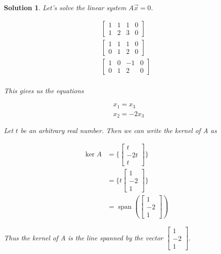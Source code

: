 \documentclass{article}
\newtheorem*{solution}{Solution}
\DeclareMathOperator{\Span}{span}
\begin{document}
\begin{solution}
Let's solve the linear system $A\vec{x} = 0$.

\begin{align*}
\left[ \begin{array}{ccc|c}1 & 1 & 1 & 0 \\ 1 & 2 & 3 & 0 \end{array} \right] \\
\left[ \begin{array}{ccc|c}1 & 1 & 1 & 0 \\ 0 & 1 & 2 & 0 \end{array} \right] \\
\left[ \begin{array}{ccc|c}1 & 0 & -1 & 0 \\ 0 & 1 & 2 & 0 \end{array} \right] \\
\end{align*}

This gives us the equations 

\begin{align*}
& x_{1} = x_{3} \\
& x_{2} = -2x_{3}
\end{align*}

Let $t$ be an arbitrary real number. Then we can write the kernel of A as

\begin{align*}
\ker A &= \Bigg\{ \begin{bmatrix} t \\ -2t \\ t \end{bmatrix} \Bigg\} \\
&= \Bigg\{ t \begin{bmatrix} 1 \\ -2 \\ 1 \end{bmatrix} \Bigg\} \\
&= \Span \left( \begin{bmatrix} 1 \\ -2 \\ 1 \end{bmatrix} \right)
\end{align*}

Thus the kernel of A is the line spanned by the vector $\begin{bmatrix} 1 \\ -2 \\ 1 \end{bmatrix}.$ \\


\end{solution}
\end{document}
